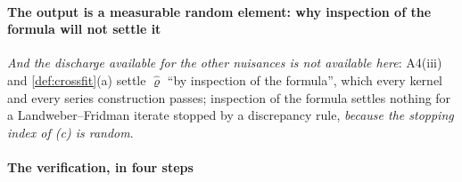 \paragraph{The output is a measurable random element: why inspection of the formula will not settle it}

\emph{And the discharge
available for the other nuisances is not available here}: A4(iii) and \cref{def:crossfit}\textup{(a)} settle
$\hat\varrho$ ``by inspection of the formula'', which every kernel and every series construction passes;
inspection of the formula settles nothing for a Landweber--Fridman iterate stopped by a discrepancy rule,
\emph{because the stopping index of \textup{(c)} is random}.

\paragraph{The verification, in four steps}

